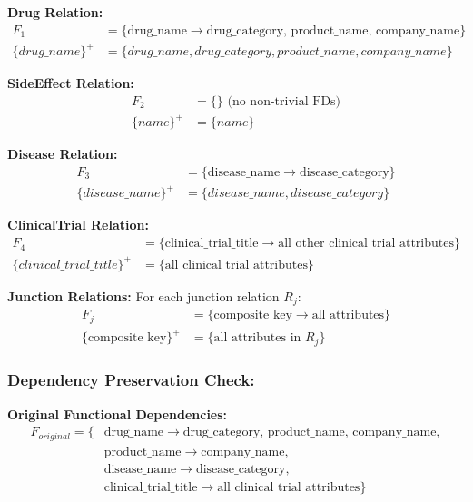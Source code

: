 \documentclass[12pt,a4paper]{article}
\begin{document}
\textbf{Drug Relation:}
\begin{align}
F_1 &= \{\text{drug\_name} \rightarrow \text{drug\_category, product\_name, company\_name}\} \\
\{drug\_name\}^+ &= \{drug\_name, drug\_category, product\_name, company\_name\}
\end{align}

\textbf{SideEffect Relation:}
\begin{align}
F_2 &= \{\} \text{ (no non-trivial FDs)} \\
\{name\}^+ &= \{name\}
\end{align}

\textbf{Disease Relation:}
\begin{align}
F_3 &= \{\text{disease\_name} \rightarrow \text{disease\_category}\} \\
\{disease\_name\}^+ &= \{disease\_name, disease\_category\}
\end{align}

\textbf{ClinicalTrial Relation:}
\begin{align}
F_4 &= \{\text{clinical\_trial\_title} \rightarrow \text{all other clinical trial attributes}\} \\
\{clinical\_trial\_title\}^+ &= \{\text{all clinical trial attributes}\}
\end{align}

\textbf{Junction Relations:}
For each junction relation $R_j$:
\begin{align}
F_j &= \{\text{composite key} \rightarrow \text{all attributes}\} \\
\{\text{composite key}\}^+ &= \{\text{all attributes in } R_j\}
\end{align}

\subsubsection*{Dependency Preservation Check:}

\textbf{Original Functional Dependencies:}
\begin{align}
F_{original} = \{&\text{drug\_name} \rightarrow \text{drug\_category, product\_name, company\_name}, \\
&\text{product\_name} \rightarrow \text{company\_name}, \\
&\text{disease\_name} \rightarrow \text{disease\_category}, \\
&\text{clinical\_trial\_title} \rightarrow \text{all clinical trial attributes}\}
\end{align}
\end{document}
